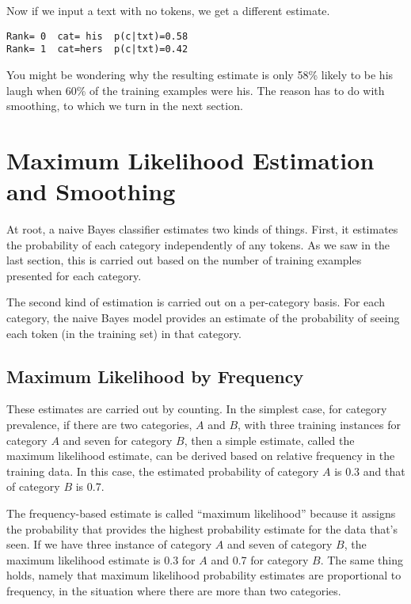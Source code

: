Now if we input a text with no tokens, we get a different estimate.
%
\begin{verbatim}
Rank= 0  cat= his  p(c|txt)=0.58
Rank= 1  cat=hers  p(c|txt)=0.42
\end{verbatim}
%
You might be wondering why the resulting estimate is only 58\% likely
to be his laugh when 60\% of the training examples were his.  The
reason has to do with smoothing, to which we turn in the next section.


\section{Maximum Likelihood Estimation and Smoothing}

At root, a naive Bayes classifier estimates two kinds of things.  First,
it estimates the probability of each category independently of any
tokens.  As we saw in the last section, this is carried out based on
the number of training examples presented for each category.

The second kind of estimation is carried out on a per-category basis.
For each category, the naive Bayes model provides an estimate of the
probability of seeing each token (in the training set) in that
category.

\subsection{Maximum Likelihood by Frequency}

These estimates are carried out by counting.  In the simplest case,
for category prevalence, if there are two categories, $A$ and $B$,
with three training instances for category $A$ and seven for category
$B$, then a simple estimate, called the maximum likelihood estimate,
can be derived based on relative frequency in the training data.  In
this case, the estimated probability of category $A$ is 0.3 and that
of category $B$ is 0.7.

The frequency-based estimate is called ``maximum likelihood'' because
it assigns the probability that provides the highest probability
estimate for the data that's seen.  If we have three instance of
category $A$ and seven of category $B$, the maximum likelihood
estimate is 0.3 for $A$ and 0.7 for category $B$.  The same thing
holds, namely that maximum likelihood probability estimates are
proportional to frequency, in the situation where there are more than
two categories.

